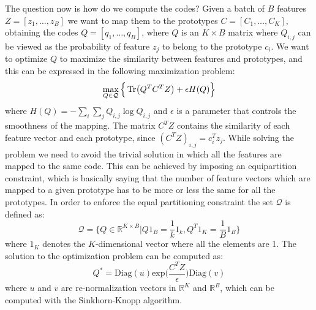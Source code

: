 The question now is how do we compute the codes? Given a batch of $B$ features $Z = [z_1, \dots, z_B]$ we want to map them to the prototypes $C= [C_1, \dots, C_K]$, obtaining the codes $Q = [q_1, \dots, q_B]$, where $Q$ is an $K\times B$ matrix where $Q_{i,j}$ can be viewed as the probability of feature $z_j$ to belong to the prototype $c_i$. We want to optimize $Q$ to maximize the similarity between features and prototypes, and this can be expressed in the following maximization problem:
\[ \max_{Q \in \mathcal{Q}} \Big\{ \Tr(Q^TC^TZ) + \epsilon H (Q) \Big\}\]
where $H(Q) = -\sum_i \sum_j Q_{i,j}\log Q_{i,j}$ and $\epsilon$ is a parameter that controls the smoothness of the mapping. The matrix $C^TZ$ contains the similarity of each feature vector and each prototype, since $(C^TZ)_{i,j} = c_i^Tz_j$.
While solving the problem we need to avoid the trivial solution in which all the features are mapped to the same code. This can be achieved by imposing an equipartition constraint, which is basically saying that the number of feature vectors which are mapped to a given prototype has to be more or less the same for all the prototypes. In order to enforce the equal partitioning constraint the set $\mathcal{Q}$ is defined as:
\[ \mathcal{Q} = \{Q \in \mathbb{R}^{K \times B} | Q1_B = \frac{1}{k}1_k, Q^T1_K = \frac{1}{B}1_B \} \]
where $1_K$ denotes the $K$-dimensional vector where all the elements are 1. The solution to the optimization problem can be computed as:
\[ Q^* = \text{Diag}(u)\text{exp}\Big(\frac{C^TZ}{\epsilon}\Big)\text{Diag}(v) \]
where $u$ and $v$ are re-normalization vectors in $\mathbb{R}^K$ and $\mathbb{R}^B$, which can be computed with the Sinkhorn-Knopp algorithm.
